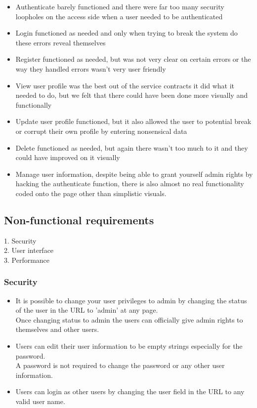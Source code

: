 \documentclass[english]{article}
\begin{document}
\begin{itemize}
\item Authenticate barely functioned and there were far too many security loopholes on the access side when a user needed to be authenticated\\
\item Login functioned as needed and only when trying to break the system do these errors reveal themselves\\
\item Register functioned as needed, but was not very clear on certain errors or the way they handled errors wasn't very user friendly\\
\item View user profile was the best out of the service contracts it did what it needed to do, but we felt that there could have been done more visually and functionally\\
\item Update user profile functioned, but it also allowed the user to potential break or corrupt their own profile by entering nonsensical data\\
\item Delete functioned as needed, but again there wasn't too much to it and they could have improved on it visually\\
\item Manage user information, despite being able to grant yourself admin rights by hacking the authenticate function, there is also almost no real functionality coded onto the page other than simplistic visuals.
  \end{itemize}
\subsection{Non-functional requirements}
1.	Security\\
2.	User interface\\
3.	Performance\\
\subsubsection{Security}
\begin{itemize}
     \item It is possible to change your user privileges to admin by changing the status of the user in the URL to 'admin' at any page.\\
     Once changing status to admin the users can officially give admin rights to themselves and other users.
     \item Users can edit their user information to be empty strings especially for the password.\\
     A password is not required to change the password or any other user information.
     \item Users can login as other users by changing the user field in the URL to any valid user name.
   \end{itemize}
\end{document}

